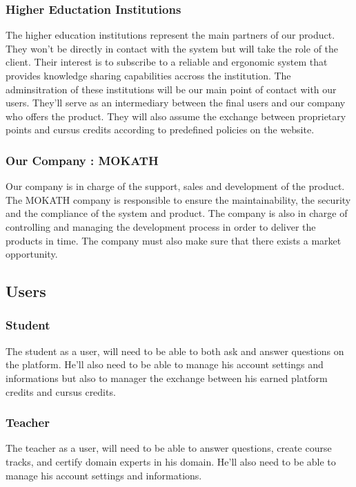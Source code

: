\documentclass[12pt,a4paper,oneside, titlepage]{article}
\begin{document}
	    \subsubsection{Higher Eductation Institutions}
	        The higher education institutions represent the main partners of our product. They won't be directly in
	        contact with the system but will take the role of the client. Their interest is to subscribe to a reliable
	        and ergonomic system that provides knowledge sharing capabilities accross the institution. The 
	        adminsitration of these institutions will be our main point of contact with our users. They'll serve as an
	        intermediary between the final users and our company who offers the product. They will also assume the
	        exchange between proprietary points and cursus credits according to predefined policies on the website. 
	    
	    \subsubsection{Our Company : MOKATH}
	        Our company is in charge of the support, sales and development of the product. The MOKATH company is 
	        responsible to ensure the maintainability, the security and the compliance of the system and product.
	        The company is also in charge of controlling and managing the development process in order to deliver the
	        products in time. The company must also make sure that there exists a market opportunity.
	        
	\subsection{Users}
	    \subsubsection{Student}
	    The student as a user, will need to be able to both ask and answer questions on the platform. He'll also need to 
	    be able to manage his account settings and informations but also to manager the exchange between his earned
	    platform credits and cursus credits.
	    
	    	\subsubsection{Teacher}
	    	The teacher as a user, will need to be able to answer questions, create course tracks, and certify domain experts 
	    	in his domain. He'll also need to be able to manage his account settings and informations.
\end{document}
